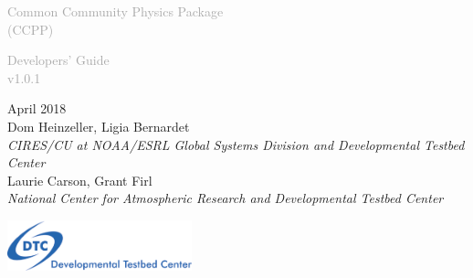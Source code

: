\begin{titlepage}
\renewcommand{\thefootnote}{\fnsymbol{footnote}}

\vspace*{1em}
\noindent

\begin{center}
\textcolor{darkgray}{\bigsf Common Community Physics Package\\[0.5ex] (CCPP)}
\vspace*{1em}

\textcolor{darkgray}{\bigst Developers' Guide\\[0.5ex] v1.0.1}
\vspace*{1em}

\large{April 2018}\\[4em]

Dom Heinzeller, Ligia Bernardet\\
\textit{\small{CIRES/CU at NOAA/ESRL Global Systems Division and Developmental Testbed Center}}\\[4em]

Laurie Carson, Grant Firl\\
\textit{\small{National Center for Atmospheric Research and Developmental Testbed Center}}\\[4em]

\vspace{4em}

\includegraphics[width=0.4\textwidth]{images/dtc_logo.png}\\[2em]

\end{center}
\end{titlepage}
\pagebreak{}
